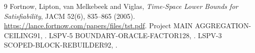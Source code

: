 \documentclass[11pt]{article}
\begin{document}
\begin{thebibliography}{9}
 Fortnow, Lipton, van Melkebeek and Viglas,
\emph{Time-Space Lower Bounds for Satisfiability},
JACM 52(6), 835--865 (2005).
\url{https://lance.fortnow.com/papers/files/tst.pdf}.
 Project MAIN AGGREGATION-CEILING91,
.
 LSPV-5 BOUNDARY-ORACLE-FACTOR128,
.
 LSPV-3 SCOPED-BLOCK-REBUILDER92,
.
\end{thebibliography}
\end{document}
